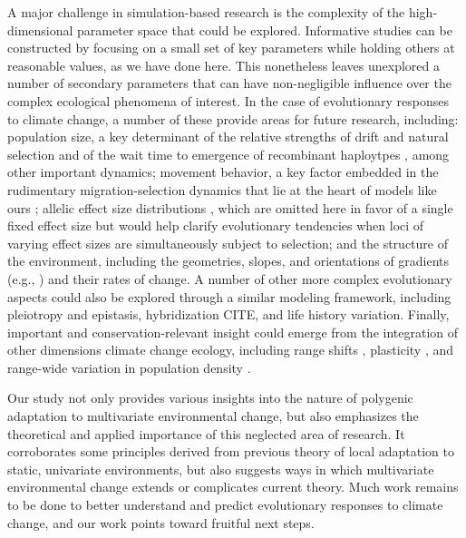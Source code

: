 \documentclass[9pt,twocolumn,twoside,lineno]{pnas-new}
\begin{document}
A major challenge in simulation-based research is the complexity of the high-dimensional 
parameter space that could be explored.
Informative studies can be constructed by focusing on a small set of
key parameters while holding others at reasonable values, as we have done here.
This nonetheless leaves unexplored a number of secondary parameters
that can have non-negligible influence over the complex ecological phenomena of interest.
In the case of evolutionary responses to climate change,
a number of these provide areas for future research, including:
population size, a key determinant of the relative strengths of drift
and natural selection \cite{murray} and of the wait time to emergence of
recombinant haploytpes \cite{christiansen}, among other important dynamics;
movement behavior, a key factor embedded in the rudimentary
migration-selection dynamics that lie at the heart of models like ours
\cite{wright,haldane,barton};
allelic effect size distributions \cite{orr},
which are omitted here in favor of a single fixed effect size but would
help clarify evolutionary tendencies when loci of varying effect sizes
are simultaneously subject to selection;
and the structure of the environment,
including the geometries, slopes, and orientations of gradients
(e.g., \cite{benes}) and their rates of change.
A number of other more complex evolutionary aspects could also be explored 
through a similar modeling framework, including 
pleiotropy \cite{thompson} and epistasis,
hybridization CITE, and life history variation.
Finally, important and conservation-relevant insight could emerge from the 
integration of other dimensions climate change ecology, including range shifts 
\cite{weiss-lehman}, plasticity \cite{chevin},
and range-wide variation in population density \cite{aitken_whitlock}.

Our study not only provides various insights into the nature
of polygenic adaptation to multivariate environmental change,
but also emphasizes the theoretical and applied importance
of this neglected area of research.
It corroborates some principles derived from previous theory
of local adaptation to static, univariate environments, but also suggests
ways in which multivariate environmental change extends
or complicates current theory.
Much work remains to be done to better understand and predict
evolutionary responses to climate change,
and our work points toward fruitful next steps.
\end{document}
